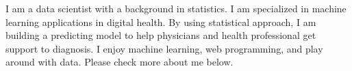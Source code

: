 %
%
%
\par{
I am a data scientist with a background in statistics. I am specialized in machine learning applications in digital health. By using statistical approach, I am building a predicting model to help physicians and health professional get support to diagnosis. I enjoy machine learning, web programming, and play around with data. Please check more about me below.
}
